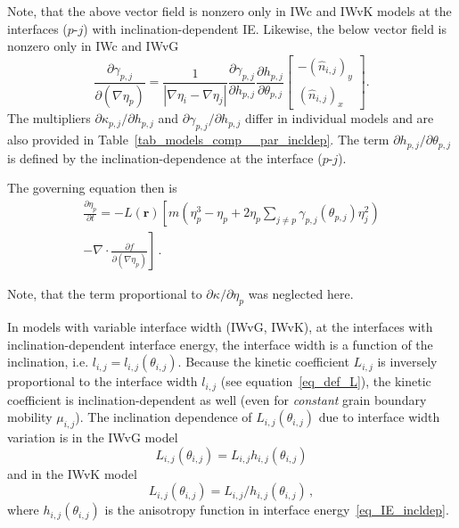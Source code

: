 		Note, that the above vector field is nonzero only in IWc and IWvK models at the interfaces ($p$-$j$) with inclination-dependent IE. Likewise, the below vector field is nonzero only in IWc and IWvG
		\begin{equation} \label{eq_dgmmijdGp}
			\frac{\partial \gamma_{p,j}}{\partial (\nabla\eta_p)} = \frac{1}{|\nabla\eta_i-\nabla\eta_j|}\frac{\partial \gamma_{p,j}}{\partial h_{p,j}}\frac{\partial h_{p,j}}{\partial \theta_{p,j}} \left[\begin{array}{c}
				-(\hat{n}_{i,j})_y   \\
				(\hat{n}_{i,j})_x
			\end{array} \right].
		\end{equation}
		The multipliers $\partial \kappa_{p,j}/\partial h_{p,j}$ and $\partial \gamma_{p,j}/\partial h_{p,j}$ differ in individual models and are also provided in Table~\ref{tab_models_comp__par_incldep}. The term $\partial h_{p,j}/\partial \theta_{p,j}$ is defined by the inclination-dependence at the interface ($p$-$j$).
		
		The governing equation then is
		\begin{equation}
			\begin{split}
				\frac{\partial \eta_p}{\partial t} = -L(\bm{r})\left[ m\left( \eta_p^3-\eta_p +  2\eta_p\sum_{j\neq p}\gamma_{p,j}(\theta_{p,j})\eta_j^2 \right) \right. \\ 
				\left.  -\nabla\cdot \frac{\partial f}{\partial(\nabla \eta_p)} \right] \,.
			\end{split}
		\end{equation}
		
		Note, that the term proportional to $\partial \kappa/\partial\eta_p$ was neglected here. 
		
		In models with variable interface width (IWvG, IWvK), at the interfaces with inclination-dependent interface energy, the interface width is a function of the inclination, i.e. $l_{i,j}=l_{i,j}(\theta_{i,j})$. Because the kinetic coefficient $L_{i,j}$ is inversely proportional to the interface width $l_{i,j}$ (see equation~\eqref{eq_def_L}), the kinetic coefficient is inclination-dependent as well (even for \textit{constant} grain boundary mobility $\mu_{i,j}$). The inclination dependence of $L_{i,j}(\theta_{i,j})$ due to interface width variation is in the IWvG model
		\begin{equation}\label{eq_Lcorr_IWvG}
			L_{i,j}(\theta_{i,j}) = L_{i,j}h_{i,j}(\theta_{i,j})
		\end{equation}
		and in the IWvK model
		\begin{equation}\label{eq_Lcorr_IWvK}
			L_{i,j}(\theta_{i,j}) = L_{i,j}/h_{i,j}(\theta_{i,j}) \,,
		\end{equation}
		where $h_{i,j}(\theta_{i,j})$ is the anisotropy function in interface energy~\eqref{eq_IE_incldep}.%
		
